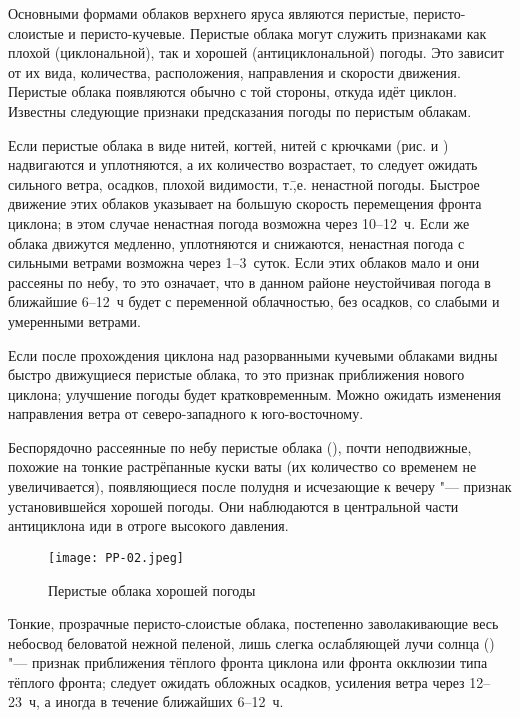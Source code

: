 Основными формами облаков верхнего яруса являются перистые,
перисто-слоистые и перисто-кучевые. Перистые облака могут служить
признаками как плохой (циклональной),
так и хорошей (антициклональной)
погоды. Это зависит от их вида, количества, расположения, направления
и скорости движения. Перистые облака появляются обычно с той стороны,
откуда идёт циклон. Известны следующие признаки предсказания погоды по
перистым облакам.

 Если перистые облака в виде нитей, когтей, нитей с крючками
(рис.  и ) надвигаются и уплотняются, а их количество возрастает,
то следует ожидать сильного ветра, осадков, плохой видимости,
т.\=,е. ненастной погоды. Быстрое движение этих облаков указывает на
большую скорость перемещения фронта циклона; в этом случае ненастная
погода возможна через 10--12~ч. Если же облака движутся медленно,
уплотняются и снижаются, ненастная погода с сильными ветрами возможна
через 1--3~суток. Если этих облаков мало и они рассеяны по небу,
то это означает, что в данном районе неустойчивая погода в ближайшие
6--12~ч будет с переменной облачностью, без осадков, со слабыми и
умеренными ветрами.

 Если после прохождения циклона над разорванными кучевыми
облаками видны быстро движущиеся перистые облака, то это признак
приближения нового циклона; улучшение погоды будет
кратковременным. Можно ожидать изменения направления ветра от
северо-западного к юго-восточному.

 Беспорядочно рассеянные по небу перистые облака (),
почти неподвижные, похожие на тонкие растрёпанные куски ваты (их
количество со временем не увеличивается), появляющиеся после полудня и
исчезающие к вечеру "--- признак установившейся хорошей погоды. Они
наблюдаются в центральной части антициклона иди в отроге высокого
давления.

\begin{figure}[htb]
  \centering{}
  \texttt{[image: PP-02.jpeg]}
  \caption{Перистые облака хорошей погоды}
  \label{fig:pp02}
  \small
  \centering{}
\end{figure}

 Тонкие, прозрачные перисто-слоистые облака, постепенно
заволакивающие весь небосвод беловатой нежной пеленой, лишь слегка
ослабляющей лучи солнца () "--- признак приближения тёплого
фронта циклона или фронта окклюзии
типа тёплого фронта; следует ожидать обложных
осадков, усиления ветра через 12--23~ч, а иногда в течение ближайших
6--12~ч.

